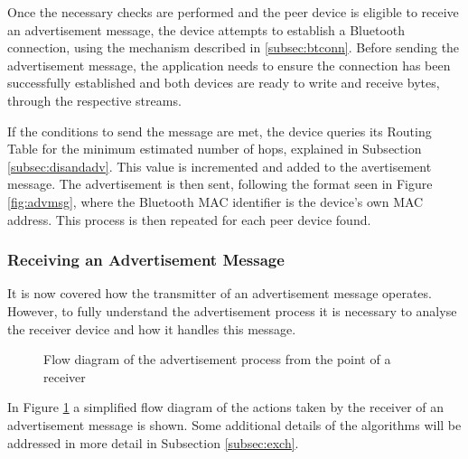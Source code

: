 Once the necessary checks are performed and the peer device is eligible to receive an advertisement message, the device attempts to establish a Bluetooth connection, using the mechanism described in \ref{subsec:btconn}. Before sending the advertisement message, the application needs to ensure the connection has been successfully established and both devices are ready to write and receive bytes, through the respective streams.

If the conditions to send the message are met, the device queries its Routing Table for the minimum estimated number of hops, explained in Subsection \ref{subsec:disandadv}. This value is incremented and added to the avertisement message. The advertisement is then sent, following the format seen in Figure \ref{fig:advmsg}, where the Bluetooth \gls{MAC} identifier is the device's own \gls{MAC} address. This process is then repeated for each peer device found.

\subsubsection{Receiving an Advertisement Message}
\label{subsubsec:rcvadv}

It is now covered how the transmitter of an advertisement message operates. However, to fully understand the advertisement process it is necessary to analyse the receiver device and how it handles this message. 

\begin{figure}[ht]
	\noindent{}
	\caption{\label{fig:recvadvflux} Flow diagram of the advertisement process from the point of a receiver}
\end{figure}

In Figure \ref{fig:recvadvflux} a simplified flow diagram of the actions taken by the receiver of an advertisement message is shown. Some additional details of the algorithms will be addressed in more detail in Subsection \ref{subsec:exch}.

